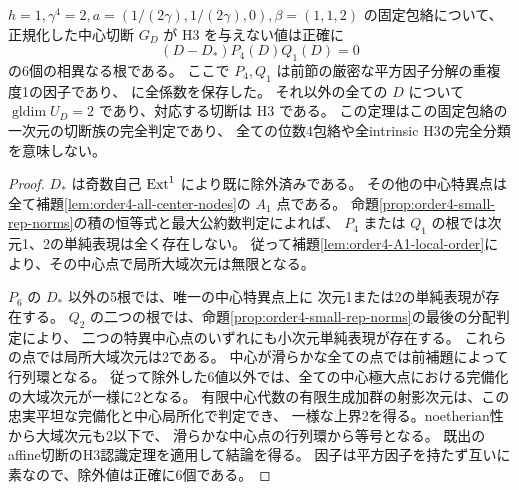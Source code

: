 \begin{theorem}
\label{thm:order4-fixed-all-bad}
$h=1,\gamma^4=2,a=(1/(2\gamma),1/(2\gamma),0),\beta=(1,1,2)$ の固定包絡について、
正規化した中心切断 $G_D$ が H3 を与えない値は正確に
\[
 \boxed{\quad (D-D_*)P_4(D)Q_1(D)=0\quad}
\]
の6個の相異なる根である。
ここで $P_4,Q_1$ は前節の厳密な平方因子分解の重複度1の因子であり、
 に全係数を保存した。
それ以外の全ての $D$ について $\operatorname{gldim}U_D=2$ であり、対応する切断は H3 である。
この定理はこの固定包絡の一次元の切断族の完全判定であり、
全ての位数4包絡や全intrinsic H3の完全分類を意味しない。
\end{theorem}
\begin{proof}
$D_*$ は奇数自己 $\operatorname{Ext}^1$ により既に除外済みである。
その他の中心特異点は全て補題\ref{lem:order4-all-center-nodes}の $A_1$ 点である。
命題\ref{prop:order4-small-rep-norms}の積の恒等式と最大公約数判定によれば、
$P_4$ または $Q_1$ の根では次元1、2の単純表現は全く存在しない。
従って補題\ref{lem:order4-A1-local-order}により、その中心点で局所大域次元は無限となる。

$P_6$ の $D_*$ 以外の5根では、唯一の中心特異点上に
次元1または2の単純表現が存在する。
$Q_2$ の二つの根では、命題\ref{prop:order4-small-rep-norms}の最後の分配判定により、
二つの特異中心点のいずれにも小次元単純表現が存在する。
これらの点では局所大域次元は2である。
中心が滑らかな全ての点では前補題によって行列環となる。
従って除外した6値以外では、全ての中心極大点における完備化の大域次元が一様に2となる。
有限中心代数の有限生成加群の射影次元は、この忠実平坦な完備化と中心局所化で判定でき、
一様な上界2を得る。noetherian性から大域次元も2以下で、
滑らかな中心点の行列環から等号となる。
既出のaffine切断のH3認識定理を適用して結論を得る。
因子は平方因子を持たず互いに素なので、除外値は正確に6個である。
\end{proof}

